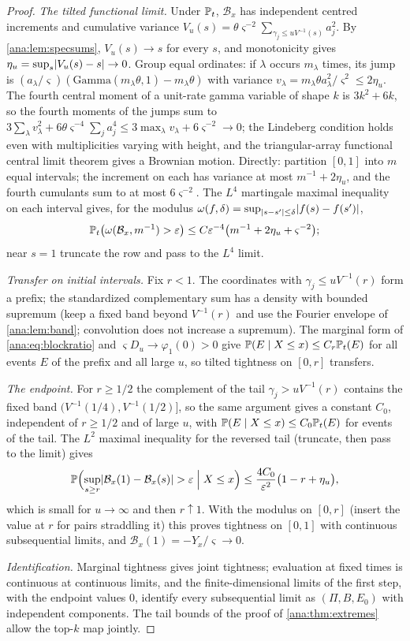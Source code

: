 \begin{proof}
\emph{The tilted functional limit.} Under $\mathbb{P}_t$, $\mathcal B_x$ has independent centred increments
and cumulative variance $V_u(s)=\theta\varsigma^{-2}\sum_{\gamma_j\le uV^{-1}(s)}a_j^2$. By
\cref{ana:lem:specsums}, $V_u(s)\to s$ for every $s$, and monotonicity gives
$\eta_u=\sup_s\lvert V_u(s)-s\rvert\to0$. Group equal ordinates: if $\lambda$ occurs $m_\lambda$ times, its jump
is $(a_\lambda/\varsigma)(\mathrm{Gamma}(m_\lambda\theta,1)-m_\lambda\theta)$ with variance
$v_\lambda=m_\lambda\theta a_\lambda^2/\varsigma^2\le2\eta_u$. The fourth central moment of a unit-rate
gamma variable of shape $k$ is $3k^2+6k$, so the fourth moments of the jumps sum to
$3\sum_\lambda v_\lambda^2+6\theta\varsigma^{-4}\sum_ja_j^4\le3\max_\lambda v_\lambda+6\varsigma^{-2}\to0$;
the Lindeberg condition holds even with multiplicities varying with height, and the triangular-array
functional central limit theorem \cite{Whitt2007Proofs} gives a Brownian motion. Directly: partition
$[0,1]$ into $m$ equal intervals; the increment on each has variance at most $m^{-1}+2\eta_u$, and the
fourth cumulants sum to at most $6\varsigma^{-2}$. The $L^4$ martingale maximal inequality on each interval
gives, for the modulus $\omega(f,\delta)=\sup_{\lvert s-s'\rvert\le\delta}\lvert f(s)-f(s')\rvert$,
\[
 \mathbb{P}_t\bigl(\omega(\mathcal B_x,m^{-1})>\varepsilon\bigr)\le C\varepsilon^{-4}\bigl(m^{-1}+2\eta_u+\varsigma^{-2}\bigr);
\]
near $s=1$ truncate the row and pass to the $L^4$ limit.

\emph{Transfer on initial intervals.} Fix $r<1$. The coordinates with $\gamma_j\le uV^{-1}(r)$ form a
prefix; the standardized complementary sum has a density with bounded supremum (keep a fixed band beyond
$V^{-1}(r)$ and use the Fourier envelope of \cref{ana:lem:band}; convolution does not increase a
supremum). The marginal form of \eqref{ana:eq:blockratio} and $\varsigma D_u\to\varphi_1(0)>0$ give
$\mathbb{P}(E\mid X\le x)\le C_r\mathbb{P}_t(E)$ for all events $E$ of the prefix and all large $u$, so tilted
tightness on $[0,r]$ transfers.

\emph{The endpoint.} For $r\ge1/2$ the complement of the tail $\gamma_j>uV^{-1}(r)$ contains the fixed band
$(V^{-1}(1/4),V^{-1}(1/2)]$, so the same argument gives a constant $C_0$, independent of $r\ge1/2$ and of
large $u$, with $\mathbb{P}(E\mid X\le x)\le C_0\mathbb{P}_t(E)$ for events of the tail. The $L^2$ maximal
inequality for the reversed tail (truncate, then pass to the limit) gives
\[
 \mathbb{P}\Bigl(\sup_{s\ge r}\lvert\mathcal B_x(1)-\mathcal B_x(s)\rvert>\varepsilon\Bigm| X\le x\Bigr)
 \le\frac{4C_0}{\varepsilon^2}\bigl(1-r+\eta_u\bigr),
\]
which is small for $u\to\infty$ and then $r\uparrow1$. With the modulus on $[0,r]$ (insert the value at $r$
for pairs straddling it) this proves tightness on $[0,1]$ with continuous subsequential limits, and
$\mathcal B_x(1)=-Y_x/\varsigma\to0$.

\emph{Identification.} Marginal tightness gives joint tightness; evaluation at fixed times is continuous
at continuous limits, and the finite-dimensional limits of the first step, with the endpoint values $0$,
identify every subsequential limit as $(\Pi,B,E_0)$ with independent components. The tail bounds of the
proof of \cref{ana:thm:extremes} allow the top-$k$ map jointly.
\end{proof}

